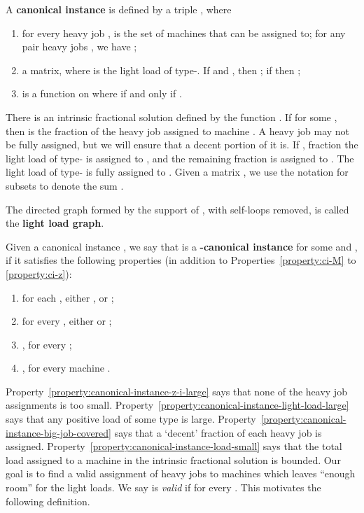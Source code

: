 \documentclass[11pt]{article}
\newenvironment{definition}{\begin{Definition}}{\end{Definition}}
\newtheorem{definition}[lemma]{Definition}
\newcounter{prop}
\newenvironment{properties}
{
\addtocounter{prop}{1}
\begin{enumerate}[labelindent=0pt,label=(\Alph{prop}\arabic*),itemindent=1em,itemsep=-1pt]
}
{
\end{enumerate}
}
\begin{document}
\begin{definition}
\label{def:ci-0}
A {\bf canonical instance} is defined by a triple , where
\begin{properties}
\item for every heavy job ,  is the set of machines that  can be assigned to; for any pair heavy jobs , we have ; \label{property:ci-M}
\item  a matrix, where   is the light load of type-. If  and , then ; if  then ;  \label{property:ci-w}
\item  is a function on  where  if and only if . \label{property:ci-z}
 \end{properties}
\end{definition}
\noindent
There is an intrinsic fractional solution defined by the function . If  for some , then  is the fraction of the heavy job  assigned to machine . A heavy job may not be fully assigned, but we will ensure that a decent portion of it is.  If ,  fraction the  light load of type- is assigned to , and the remaining  fraction is assigned to .  The  light load of type- is fully assigned to .  
Given a matrix , we use the notation  for subsets  to denote the sum .   

\begin{definition}
The directed graph  formed by the support of , with self-loops removed, is called the {\bf light load graph}.
\end{definition}

\begin{definition}
Given a canonical instance , we say that  is a {\bf -canonical instance} for some  and , if it satisfies the following properties (in addition to Properties~\ref{property:ci-M} to \ref{property:ci-z}):
\begin{properties}
\item for each , either , or ; 
\label{property:canonical-instance-z-i-large}
\item for every , either  or ;
\label{property:canonical-instance-light-load-large}
\item , for every ;
\label{property:canonical-instance-big-job-covered}
\item , for every machine .
\label{property:canonical-instance-load-small}
\end{properties}
\end{definition}

Property~\ref{property:canonical-instance-z-i-large} says that none of the heavy job assignments is too small.  Property~\ref{property:canonical-instance-light-load-large} says that any positive load of some type is large. Property~\ref{property:canonical-instance-big-job-covered} says that  a `decent' fraction of each heavy job  is assigned. Property~\ref{property:canonical-instance-load-small} says that the total load assigned to a machine  in the intrinsic fractional solution is bounded.
Our goal is to find a valid assignment  of heavy jobs to machines which leaves ``enough room'' for the light loads. We say  is {\em valid} if  for every . This motivates the following definition.
\end{document}
